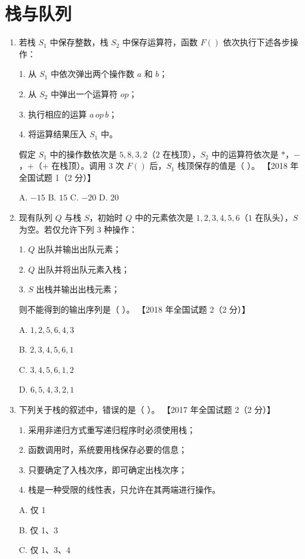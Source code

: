\documentclass[lang=cn,newtx,10pt,scheme=chinese]{../../elegantbook}
\begin{document}
\chapter{栈与队列}
\begin{enumerate}
    \item 若栈 $S_1$ 中保存整数，栈 $S_2$ 中保存运算符，函数 $F()$ 依次执行下述各步操作：  
    
    1. 从 $S_1$ 中依次弹出两个操作数 $a$ 和 $b$；  

    2. 从 $S_2$ 中弹出一个运算符 $op$；  

    3. 执行相应的运算 $a \, op \, b$；

    4. 将运算结果压入 $S_1$ 中。  

    假定 $S_1$ 中的操作数依次是 $5, 8, 3, 2$（$2$ 在栈顶），$S_2$ 中的运算符依次是 $*$，$-$，$+$（$+$ 在栈顶）。调用 3 次 $F()$ 后，$S_1$ 栈顶保存的值是（ ）。  
    【2018 年全国试题 1（2 分）】  
    
    A. $-15$ \quad B. $15$ \quad C. $-20$ \quad D. $20$  

    \item 现有队列 $Q$ 与栈 $S$，初始时 $Q$ 中的元素依次是 $1, 2, 3, 4, 5, 6$（$1$ 在队头），$S$ 为空。若仅允许下列 3 种操作：  
    
    1. $Q$ 出队并输出出队元素；  

    2. $Q$ 出队并将出队元素入栈；

    3. $S$ 出栈并输出出栈元素；  

    则不能得到的输出序列是（ ）。  
    【2018 年全国试题 2（2 分）】  

    A. $1, 2, 5, 6, 4, 3$  

    B. $2, 3, 4, 5, 6, 1$  

    C. $3, 4, 5, 6, 1, 2$  

    D. $6, 5, 4, 3, 2, 1$  

    \item 下列关于栈的叙述中，错误的是（ ）。  
    【2017 年全国试题 2（2 分）】  

    1. 采用非递归方式重写递归程序时必须使用栈；

    2. 函数调用时，系统要用栈保存必要的信息；  

    3. 只要确定了入栈次序，即可确定出栈次序；  

    4. 栈是一种受限的线性表，只允许在其两端进行操作。  

    A. 仅 1  

    B. 仅 1、3  

    C. 仅 1、3、4  


\end{enumerate}
\end{document}
